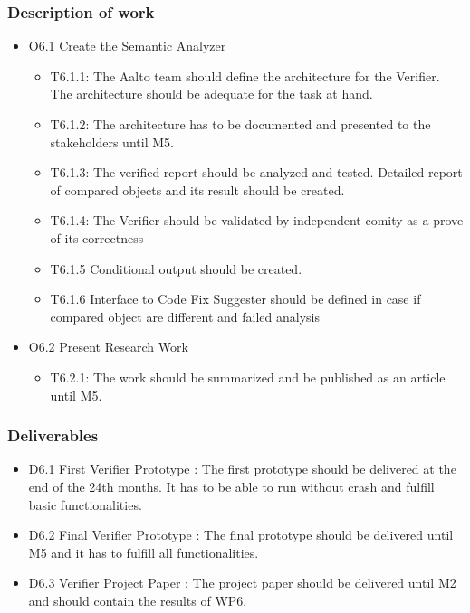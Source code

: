 \subsubsection{Description of work}
	\begin{itemize}
	\item O6.1 Create the Semantic Analyzer
	\begin{itemize}
		\item T6.1.1: The \gls{Aalto} team should define the architecture for the Verifier. The architecture should be adequate for the task at hand.
		\item T6.1.2: The architecture has to be documented and presented to the stakeholders until M5.
		\item T6.1.3: The verified report should be analyzed and tested. Detailed report of compared objects and its result should be created. 
		\item T6.1.4: The Verifier should be validated by independent comity as a prove of its correctness
		\item T6.1.5 Conditional output should be created.
		\item T6.1.6 Interface to Code Fix Suggester should be defined in case if compared object are different and failed analysis
	\end{itemize}
	
	\item O6.2 Present Research Work
	\begin{itemize}
		\item T6.2.1: The work should be summarized and be published as an article until M5. 
	\end{itemize}
\end{itemize}

\subsubsection{Deliverables}
	\begin{itemize}
		\item D6.1 First Verifier Prototype : The first prototype should be delivered at the end of the 24th months. It has to be able to run without crash and fulfill basic functionalities.
		\item D6.2 Final Verifier Prototype : The final prototype should be delivered until M5 and it has to fulfill all functionalities.
		\item D6.3 Verifier Project Paper : The project paper should be delivered until M2 and should contain the results of WP6.
	\end{itemize}